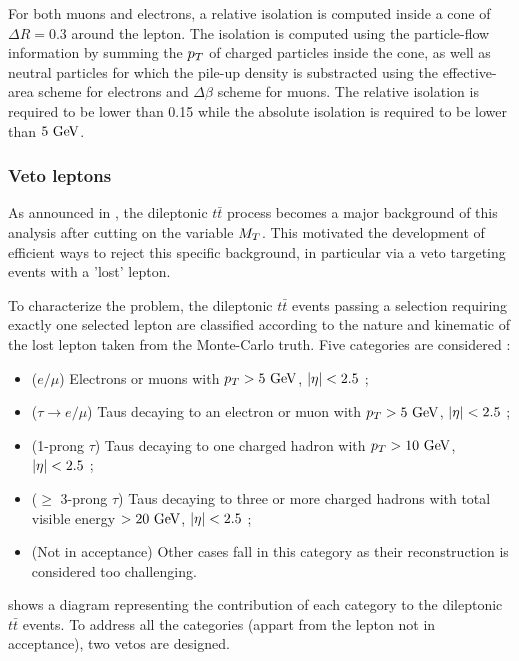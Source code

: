     For both muons and electrons, a relative isolation is computed inside a cone of
    $\Delta R = 0.3$ around the lepton. The isolation is computed using the particle-flow
    information by summing the $p_T$ of charged particles inside the cone, as well as
    neutral particles for which the pile-up density is substracted using the effective-area
    scheme for electrons and $\Delta \beta$ scheme for muons. The relative isolation is
    required to be lower than 0.15 while the absolute isolation is required to be lower
    than $5~\text{GeV}$.

        \subsubsection{Veto leptons \label{sec:vetoLeptons}}

    As announced in , the dileptonic $t\bar{t}$
    process becomes a major background of this analysis after cutting on the variable $M_T$.
    This motivated the development of efficient ways to reject this specific background,
    in particular via a veto targeting events with a 'lost' lepton.

    To characterize the problem, the dileptonic $t\bar{t}$ events passing a selection
    requiring exactly one selected lepton are classified according to the nature and
    kinematic of the lost lepton taken from the Monte-Carlo truth. Five categories are considered :
    \begin{itemize}
        \item ($e/\mu$) Electrons or muons with $p_T > 5~\text{GeV}$, $\left| \eta \right| < 2.5$ ;
        \item ($\tau \rightarrow e/\mu$) Taus decaying to an electron or muon with $p_T > 5~\text{GeV}$, $\left| \eta \right| < 2.5$ ;
        \item (1-prong $\tau$) Taus decaying to one charged hadron with $p_T > 10~\text{GeV}$, $\left| \eta \right| < 2.5$ ;
        \item ($\geq$ 3-prong $\tau$) Taus decaying to three or more charged hadrons
              with total visible energy $> 20~\text{GeV}$, $\left| \eta \right| < 2.5$ ;
        \item (Not in acceptance) Other cases fall in this category as their reconstruction
              is considered too challenging.
    \end{itemize}

     shows a diagram representing
    the contribution of each category to the dileptonic $t\bar{t}$ events. To address all
    the categories (appart from the lepton not in acceptance), two vetos are designed.

